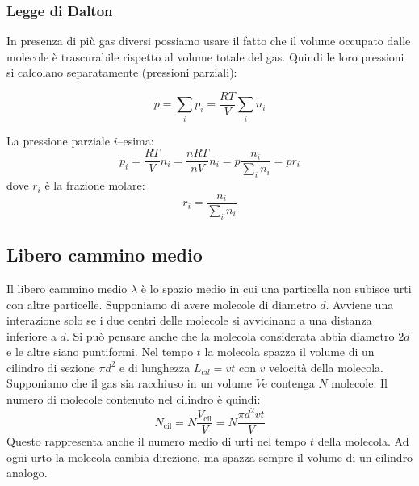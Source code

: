 \subsubsection{Legge di Dalton}
In presenza di più gas diversi possiamo usare il fatto che il volume occupato dalle molecole è trascurabile rispetto al volume totale del gas. Quindi le loro pressioni si calcolano separatamente (pressioni parziali):
\begin{legge}[Dalton]
   \begin{equation}
      p = \sum_i p_i = \frac{RT}{V}\sum_i{n_i}
   \end{equation}
\end{legge}
La pressione parziale $i$--esima:
\begin{equation}
   p_i = \frac{RT}{V}n_i = \frac{nRT}{nV}n_i = p\frac{n_i}{\sum_i n_i} = pr_i
\end{equation}
dove $r_i$ è la frazione molare:
\begin{equation}
   r_i = \frac{n_i}{\sum_i n_i}
\end{equation}


\subsection{Libero cammino medio}
\label{libero cammino medio fisica1}
Il libero cammino medio $\lambda$ è lo spazio medio in cui una particella non subisce urti con altre particelle. Supponiamo di avere molecole di diametro $d$. Avviene una interazione solo se i due centri delle molecole si avvicinano a una distanza inferiore a $d$. Si può pensare anche che la molecola considerata abbia diametro $2d$ e le altre siano puntiformi. Nel tempo $t$ la molecola spazza il volume di un cilindro di sezione $\pi d^2$ e di lunghezza $L_{cil}=vt$ con $v$ velocità della molecola. Supponiamo che il gas sia racchiuso in un volume $V$e contenga $N$ molecole. Il numero di molecole contenuto nel cilindro è quindi:
\[N_{\text{cil}}=N\frac{V_{\text{cil}}}{V}=N\frac{\pi d^2vt}{V}\]
Questo rappresenta anche il numero medio di urti nel tempo $t$ della molecola. Ad ogni urto la molecola cambia direzione, ma spazza sempre il volume di un cilindro analogo.

